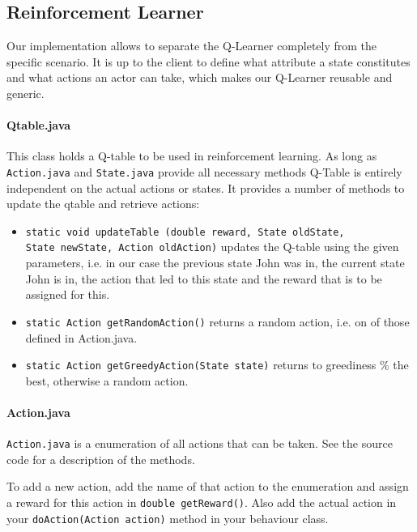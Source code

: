 \documentclass[a4paper,10pt]{scrartcl}
\begin{document}
\subsection{Reinforcement Learner}
Our implementation allows to separate the Q-Learner completely from the specific scenario. It is up to the client to define what attribute a state constitutes and what actions an actor can take, which makes our Q-Learner reusable and generic. 

\paragraph{Qtable.java}
This class holds a Q-table to be used in reinforcement learning. As long as \verb|Action.java| and \verb|State.java| provide all necessary methods Q-Table is entirely independent on the actual actions or states. It provides a number of methods to update the qtable and retrieve actions:

\begin{itemize}
 \item \verb|static void updateTable (double reward, State oldState,|\\
  \verb|State newState, Action oldAction)| updates the Q-table using the given parameters, i.e. in our case the previous state John was in, the current state John is in, the action that led to this state and the reward that is to be assigned for this.
 \item \verb|static Action getRandomAction()| returns a random action, i.e. on of those defined in Action.java.
 \item \verb|static Action getGreedyAction(State state)| returns to  greediness \% the best, otherwise a random action.
\end{itemize}

\paragraph{Action.java}
\verb|Action.java| is a enumeration of all actions that can be taken. See the source code for a description of the methods.

To add a new action, add the name of that action to the enumeration and assign a reward for this action in \verb|double getReward()|. Also add the actual action in your \verb|doAction(Action action)| method in your behaviour class.
\end{document}
